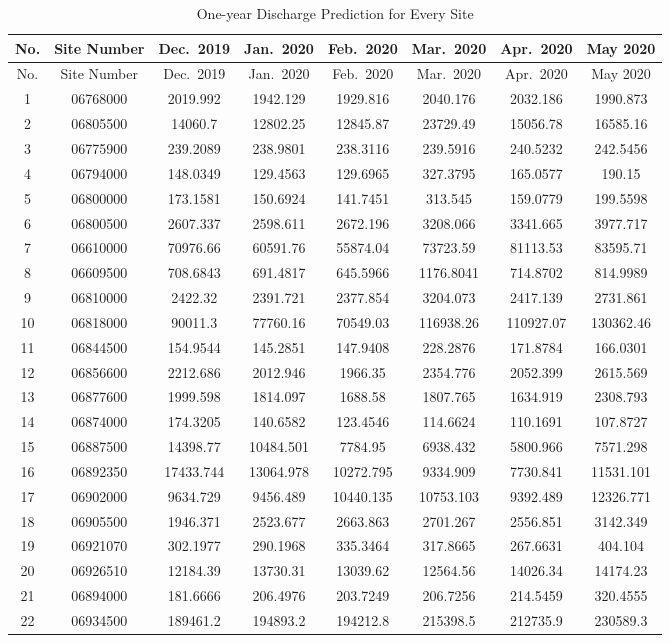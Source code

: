 \documentclass[12pt,]{article}
\begin{document}
\begin{longtable}[]{@{}cccccccc@{}}
\caption{One-year Discharge Prediction for Every Site}\tabularnewline
\toprule
No. & Site Number & Dec.~2019 & Jan.~2020 & Feb.~2020 & Mar.~2020 &
Apr.~2020 & May 2020\tabularnewline
\midrule
\endfirsthead
\toprule
No. & Site Number & Dec.~2019 & Jan.~2020 & Feb.~2020 & Mar.~2020 &
Apr.~2020 & May 2020\tabularnewline
\midrule
\endhead
1 & 06768000 & 2019.992 & 1942.129 & 1929.816 & 2040.176 & 2032.186 &
1990.873\tabularnewline
2 & 06805500 & 14060.7 & 12802.25 & 12845.87 & 23729.49 & 15056.78 &
16585.16\tabularnewline
3 & 06775900 & 239.2089 & 238.9801 & 238.3116 & 239.5916 & 240.5232 &
242.5456\tabularnewline
4 & 06794000 & 148.0349 & 129.4563 & 129.6965 & 327.3795 & 165.0577 &
190.15\tabularnewline
5 & 06800000 & 173.1581 & 150.6924 & 141.7451 & 313.545 & 159.0779 &
199.5598\tabularnewline
6 & 06800500 & 2607.337 & 2598.611 & 2672.196 & 3208.066 & 3341.665 &
3977.717\tabularnewline
7 & 06610000 & 70976.66 & 60591.76 & 55874.04 & 73723.59 & 81113.53 &
83595.71\tabularnewline
8 & 06609500 & 708.6843 & 691.4817 & 645.5966 & 1176.8041 & 714.8702 &
814.9989\tabularnewline
9 & 06810000 & 2422.32 & 2391.721 & 2377.854 & 3204.073 & 2417.139 &
2731.861\tabularnewline
10 & 06818000 & 90011.3 & 77760.16 & 70549.03 & 116938.26 & 110927.07 &
130362.46\tabularnewline
11 & 06844500 & 154.9544 & 145.2851 & 147.9408 & 228.2876 & 171.8784 &
166.0301\tabularnewline
12 & 06856600 & 2212.686 & 2012.946 & 1966.35 & 2354.776 & 2052.399 &
2615.569\tabularnewline
13 & 06877600 & 1999.598 & 1814.097 & 1688.58 & 1807.765 & 1634.919 &
2308.793\tabularnewline
14 & 06874000 & 174.3205 & 140.6582 & 123.4546 & 114.6624 & 110.1691 &
107.8727\tabularnewline
15 & 06887500 & 14398.77 & 10484.501 & 7784.95 & 6938.432 & 5800.966 &
7571.298\tabularnewline
16 & 06892350 & 17433.744 & 13064.978 & 10272.795 & 9334.909 & 7730.841
& 11531.101\tabularnewline
17 & 06902000 & 9634.729 & 9456.489 & 10440.135 & 10753.103 & 9392.489 &
12326.771\tabularnewline
18 & 06905500 & 1946.371 & 2523.677 & 2663.863 & 2701.267 & 2556.851 &
3142.349\tabularnewline
19 & 06921070 & 302.1977 & 290.1968 & 335.3464 & 317.8665 & 267.6631 &
404.104\tabularnewline
20 & 06926510 & 12184.39 & 13730.31 & 13039.62 & 12564.56 & 14026.34 &
14174.23\tabularnewline
21 & 06894000 & 181.6666 & 206.4976 & 203.7249 & 206.7256 & 214.5459 &
320.4555\tabularnewline
22 & 06934500 & 189461.2 & 194893.2 & 194212.8 & 215398.5 & 212735.9 &
230589.3\tabularnewline
\bottomrule
\end{longtable}
\end{document}
